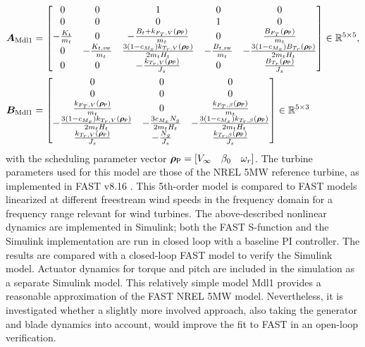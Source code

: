 \begin{align*}
    \bm{A}_{\text{Mdl1}} &= \begin{bmatrix}
        0 & 0 & 1 & 0 & 0 \\
        0 & 0 & 0 & 1 & 0 \\
        - \frac{K_t}{m_t} & 0 & -\frac{B_t+ k_{F_T,V}(\bm{\rho}_{\mathsf{P}})}{m_t} & 0 & \frac{B_{F_T}(\bm{\rho}_{\mathsf{P}})}{m_t} \\
        0 &  - \frac{K_{t,\text{sw}}}{m_t}  & \frac{3(1-c_{M_x})k_{T_r,V}(\bm{\rho}_{\mathsf{P}})}{2 m_t H_t} & - \frac{B_{t,\text{sw}}}{m_t} & -\frac{3(1-c_{M_x})B_{T_r}(\bm{\rho}_{\mathsf{P}})}{2 m_t H_t} \\
        0 & 0 & - \frac{k_{T_r,V}(\bm{\rho}_{\mathsf{P}})}{J_s} & 0 & \frac{B_{T_r}(\bm{\rho}_{\mathsf{P}})}{J_s}
    \end{bmatrix}  \in \mathbb{R}^{5 \times 5},\\
    \bm{B}_{\text{Mdl1}} &= \begin{bmatrix}
        0 & 0 & 0 \\
        0 & 0 & 0 \\
        \frac{k_{F_T,V}(\bm{\rho}_{\mathsf{P}})}{m_t} & 0 & \frac{k_{F_T,\beta}(\bm{\rho}_{\mathsf{P}})}{m_t} \\
        -\frac{3(1-c_{M_x})k_{T_r,V}(\bm{\rho}_{\mathsf{P}})}{2 m_t H_t} & -\frac{3 c_{M_x} N_g}{2 m_t H_t} &  -\frac{3(1-c_{M_x})k_{T_r,\beta}(\bm{\rho}_{\mathsf{P}})}{2 m_t H_t}\\
        \frac{k_{T_r,V}(\bm{\rho}_{\mathsf{P}})}{J_s} & -\frac{N_g}{J_s} &  \frac{k_{T_r,\beta}(\bm{\rho}_{\mathsf{P}})}{J_s}
    \end{bmatrix}  \in \mathbb{R}^{5 \times 3}
\end{align*} \enlargethispage{\baselineskip}
with the scheduling parameter vector $\bm{\rho}_{\mathsf{P}} = \left[V_{\infty}\quad \beta_0 \quad \omega_r\right]$. The turbine parameters used for this model are those of the NREL 5MW reference turbine, as implemented in FAST v8.16 \cite{jonkman2016fast}. 
%
This 5th-order model is compared to FAST models linearized at different freestream wind speeds in the frequency domain for a frequency range relevant for wind turbines. The above-described nonlinear dynamics are implemented in Simulink; both the FAST S-function and the Simulink implementation are run in closed loop with a baseline PI controller. The results are compared with a closed-loop FAST model to verify the Simulink model. Actuator dynamics for torque and pitch are included in the simulation as a separate Simulink model.
%
This relatively simple model Mdl1 provides a reasonable approximation of the FAST NREL 5MW model. Nevertheless, it is investigated whether a slightly more involved approach, also taking the generator and blade dynamics into account, would improve the fit to FAST in an open-loop verification.


